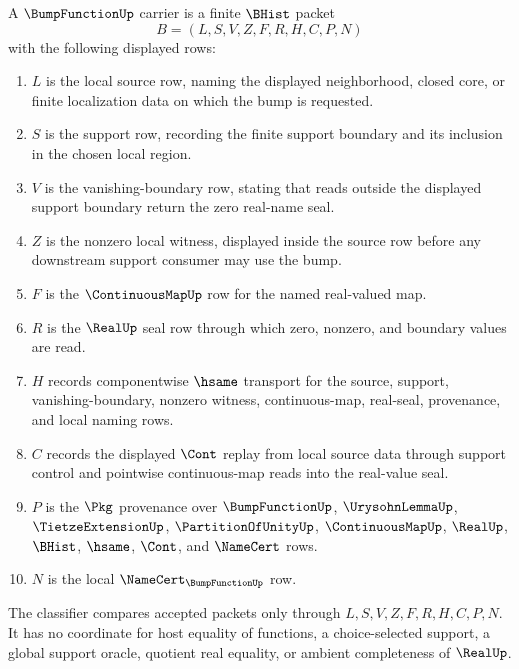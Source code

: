 \begin{definition}
\label{def:bump-function-carrier}
A $\BumpFunctionUp$ carrier is a finite $\BHist$ packet
$$
B=(L,S,V,Z,F,R,H,C,P,N)
$$
with the following displayed rows:
\begin{enumerate}
\item $L$ is the local source row, naming the displayed neighborhood, closed core, or finite localization data on which the bump is requested.
\item $S$ is the support row, recording the finite support boundary and its inclusion in the chosen local region.
\item $V$ is the vanishing-boundary row, stating that reads outside the displayed support boundary return the zero real-name seal.
\item $Z$ is the nonzero local witness, displayed inside the source row before any downstream support consumer may use the bump.
\item $F$ is the $\ContinuousMapUp$ row for the named real-valued map.
\item $R$ is the $\RealUp$ seal row through which zero, nonzero, and boundary values are read.
\item $H$ records componentwise $\hsame$ transport for the source, support, vanishing-boundary, nonzero witness, continuous-map, real-seal, provenance, and local naming rows.
\item $C$ records the displayed $\Cont$ replay from local source data through support control and pointwise continuous-map reads into the real-value seal.
\item $P$ is the $\Pkg$ provenance over $\BumpFunctionUp$, $\UrysohnLemmaUp$, $\TietzeExtensionUp$, $\PartitionOfUnityUp$, $\ContinuousMapUp$, $\RealUp$, $\BHist$, $\hsame$, $\Cont$, and $\NameCert$ rows.
\item $N$ is the local $\NameCert_{\BumpFunctionUp}$ row.
\end{enumerate}
The classifier compares accepted packets only through $L,S,V,Z,F,R,H,C,P,N$. It has no coordinate for host equality of functions, a choice-selected support, a global support oracle, quotient real equality, or ambient completeness of $\RealUp$.
\end{definition}

